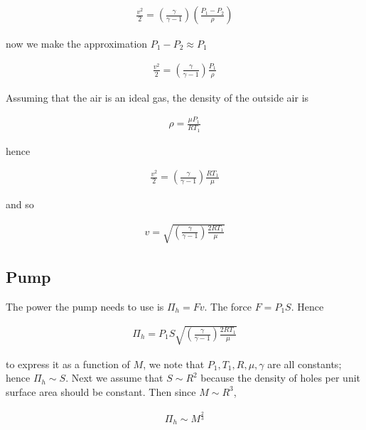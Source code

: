 \documentclass{article}
\begin{document}
\begin{align*}
\frac{v^2}{2} = \left(\frac{\gamma}{\gamma - 1}\right)\left(\frac{P_1 - P_2}{\rho}\right)
\end{align*}

now we make the approximation $P_1 - P_2 \approx P_1$

\begin{align*}
\frac{v^2}{2} = \left(\frac{\gamma}{\gamma - 1}\right)\frac{P_1}{\rho}
\end{align*}

Assuming that the air is an ideal gas, the density of the outside air is

\begin{align*}
\rho = \frac{\mu P_1}{RT_1}
\end{align*}

hence

\begin{align*}
\frac{v^2}{2} = \left(\frac{\gamma}{\gamma - 1}\right)\frac{RT_1}{\mu}
\end{align*}

and so

\begin{align*}
v = \sqrt{\left(\frac{\gamma}{\gamma - 1}\right)\frac{2RT_1}{\mu}}
\end{align*}

\subsection{Pump}

The power the pump needs to use is $\Pi_h = Fv$. The force $F = P_1 S$. Hence

\begin{align*}
\Pi_h = P_1 S \sqrt{\left(\frac{\gamma}{\gamma - 1}\right)\frac{2RT_1}{\mu}}
\end{align*}

to express it as a function of $M$, we note that $P_1, T_1, R, \mu, \gamma$ are all constants; hence $\Pi_h \sim S$. Next we assume that $S \sim R^2$ because the density of holes per unit surface area should be constant. Then since $M \sim R^3$, 

\begin{align*}
\Pi_h \sim M^\frac{2}{3}
\end{align*}
\end{document}

